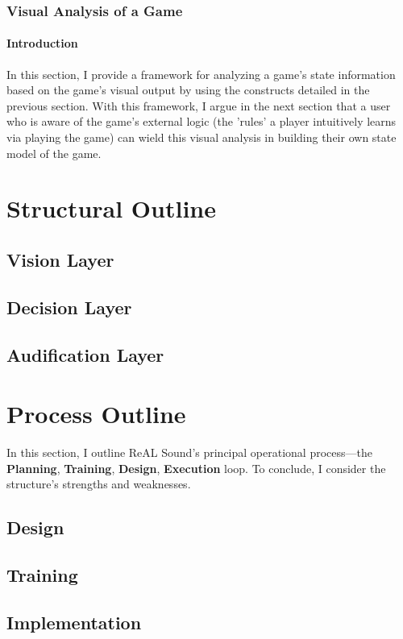 \documentclass{report}
\newcommand{\rs}{ReAL Sound\xspace}
\newcommand{\plan}{\textbf{Planning}\xspace}
\newcommand{\train}{\textbf{Training}\xspace}
\newcommand{\design}{\textbf{Design}\xspace}
\newcommand{\exec}{\textbf{Execution}\xspace}
\begin{document}
\subsubsection{Visual Analysis of a Game}

\paragraph{Introduction}
In this section, I provide a framework for analyzing a game's state information based on the game's visual output by using the constructs detailed in the previous section. With this framework, I argue in the next section that a user who is aware of the game's external logic (the 'rules' a player intuitively learns via playing the game) can wield this visual analysis in building their own state model of the game.    


\section{Structural Outline}

\subsection{Vision Layer}

\subsection{Decision Layer}

\subsection{Audification Layer}

\section{Process Outline}
In this section, I outline \rs's principal operational process---the \plan, \train, \design, \exec loop. To conclude, I consider the structure's strengths and weaknesses.        

\subsection{Design}
\subsection{Training}
\subsection{Implementation}
\end{document}

